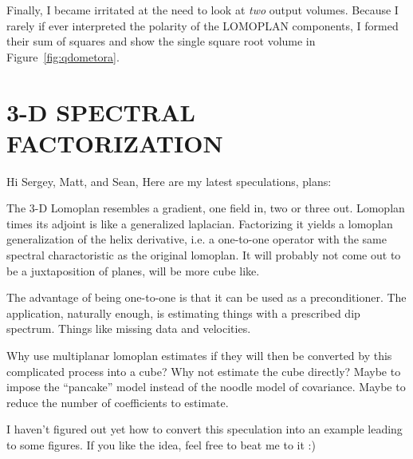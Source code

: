 \par
Finally, I became irritated at the need to look at {\it two} output volumes.
Because I rarely if ever interpreted the polarity of the LOMOPLAN components,
I formed their sum of squares and show the single
square root volume in Figure~\ref{fig:qdometora}.


\section{3-D SPECTRAL FACTORIZATION}
Hi Sergey, Matt, and Sean,
Here are my latest speculations, plans:

The 3-D Lomoplan resembles a gradient, one field in, two or three out.
Lomoplan times its adjoint is like a generalized laplacian.
Factorizing it yields a lomoplan generalization of the helix derivative,
i.e. a one-to-one operator with the same spectral charactoristic
as the original lomoplan.
It will probably not come out to be a juxtaposition of planes,
will be more cube like.

The advantage of being one-to-one is
that it can be used as a preconditioner.
The application, naturally enough,
is estimating things with a prescribed dip spectrum.
Things like missing data and velocities.

Why use multiplanar lomoplan estimates if they will then be
converted by this complicated process into a cube?
Why not estimate the cube directly?  Maybe to impose
the ``pancake'' model instead of the noodle model of covariance.
Maybe to reduce the number of coefficients to estimate.

I haven't figured out yet how to convert this speculation
into an example leading to some figures.
If you like the idea, feel free to beat me to it :)



